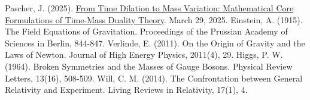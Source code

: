 \documentclass[12pt,a4paper]{article}
\begin{document}
\begin{thebibliography}{9}
		 Pascher, J. (2025). \href{https://github.com/jpascher/T0-Time-Mass-Duality/tree/main/2/pdf/English/Mathematische\%20Formulierungen\%20der\%20Zeit-Masse-Dualitätstheorie\%20mit\%20Lagrange_en.pdf}{From Time Dilation to Mass Variation: Mathematical Core Formulations of Time-Mass Duality Theory}. March 29, 2025.
		 Einstein, A. (1915). The Field Equations of Gravitation. Proceedings of the Prussian Academy of Sciences in Berlin, 844-847.
		 Verlinde, E. (2011). On the Origin of Gravity and the Laws of Newton. Journal of High Energy Physics, 2011(4), 29.
		 Higgs, P. W. (1964). Broken Symmetries and the Masses of Gauge Bosons. Physical Review Letters, 13(16), 508-509.
		 Will, C. M. (2014). The Confrontation between General Relativity and Experiment. Living Reviews in Relativity, 17(1), 4.
	\end{thebibliography}
	
\end{document}
